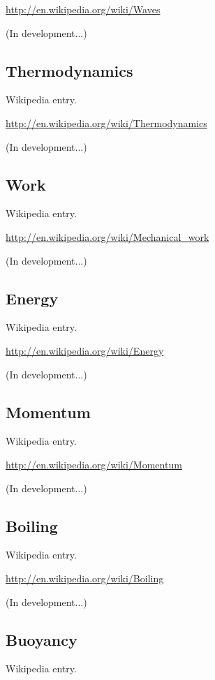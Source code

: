 \documentclass[12pt,twoside]{book}
\begin{document}
\href{http://en.wikipedia.org/wiki/Waves}{http://en.wikipedia.org/wiki/Waves}

(In development...)

\subsection[Thermodynamics]{Thermodynamics}
Wikipedia entry.

\href{http://en.wikipedia.org/wiki/Thermodynamics}{http://en.wikipedia.org/wiki/Thermodynamics}

(In development...)

\subsection[Work]{Work}
Wikipedia entry.

\href{http://en.wikipedia.org/wiki/Mechanical_work}{http://en.wikipedia.org/wiki/Mechanical\_work}

(In development...)

\subsection[Energy]{Energy}
Wikipedia entry.

\href{http://en.wikipedia.org/wiki/Energy}{http://en.wikipedia.org/wiki/Energy}

(In development...)

\subsection[Momentum]{Momentum}
Wikipedia entry.

\href{http://en.wikipedia.org/wiki/Momentum}{http://en.wikipedia.org/wiki/Momentum}

(In development...)

\subsection[Boiling]{Boiling}
Wikipedia entry.

\href{http://en.wikipedia.org/wiki/Boiling}{http://en.wikipedia.org/wiki/Boiling}

(In development...)

\subsection[Buoyancy]{Buoyancy}
Wikipedia entry.
\end{document}
